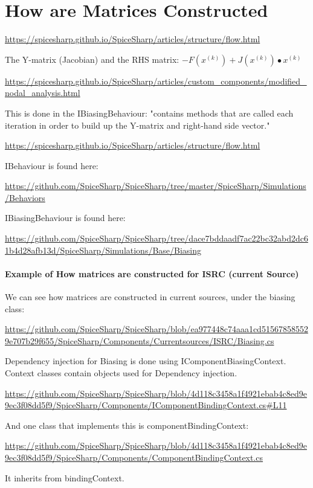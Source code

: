\documentclass[12pt]{article}
\renewcommand{\_}{\kern-1.5pt\textunderscore\kern-1.5pt}
\begin{document}
\part{How are Matrices Constructed}


\url{https://spicesharp.github.io/SpiceSharp/articles/structure/flow.html}

The Y-matrix (Jacobian) and the RHS matrix: \textbf{$-F(x^{(k)}) + J(x^{(k)}) \bullet x^{(k)}$}

\url{https://spicesharp.github.io/SpiceSharp/articles/custom_components/modified_nodal_analysis.html}

This is done in the IBiasingBehaviour: "contains methods that are called each iteration in order to build up the Y-matrix and right-hand side vector."

\url{https://spicesharp.github.io/SpiceSharp/articles/structure/flow.html}

IBehaviour is found here:

\url{https://github.com/SpiceSharp/SpiceSharp/tree/master/SpiceSharp/Simulations/Behaviors}

IBiasingBehaviour is found here:

\url{https://github.com/SpiceSharp/SpiceSharp/tree/dace7bddaadf7ac22bc32abd2dc61b4d28afb13d/SpiceSharp/Simulations/Base/Biasing}

\subsection{Example of How matrices are constructed for ISRC (current Source)}
We can see how matrices are constructed in current sources, under the biasing class:


\url{https://github.com/SpiceSharp/SpiceSharp/blob/ea977448c74aaa1cd515678585529e707b29f655/SpiceSharp/Components/Currentsources/ISRC/Biasing.cs}

Dependency injection for Biasing is done using IComponentBiasingContext.
Context classes contain objects used for Dependency injection.

\url{https://github.com/SpiceSharp/SpiceSharp/blob/4d118c3458a1f4921ebab4c8ed9e9ec3f08dd5f9/SpiceSharp/Components/IComponentBindingContext.cs#L11}

And one class that implements this is componentBindingContext:

\url{https://github.com/SpiceSharp/SpiceSharp/blob/4d118c3458a1f4921ebab4c8ed9e9ec3f08dd5f9/SpiceSharp/Components/ComponentBindingContext.cs}

It inherits from bindingContext.
\end{document}
